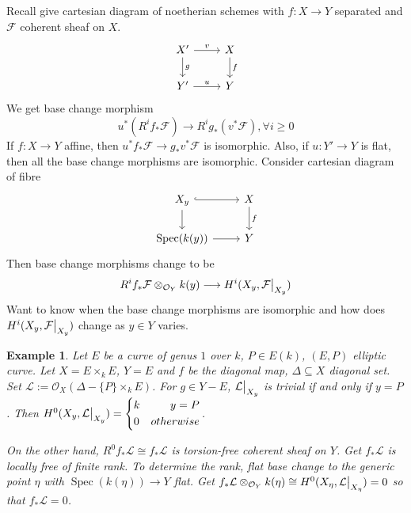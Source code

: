 \documentclass{ctexart}
\newtheorem{example}{Example}[section]
\newcommand{\spec}{\operatorname{Spec}}
\begin{document}
Recall give cartesian diagram of noetherian schemes with $f: X \longrightarrow Y$ separated and $\mathcal{F}$ coherent sheaf on $X$.
\begin{equation*}
    \begin{tikzcd}
        X' \arrow[r, "v"] \arrow[d, "g"] &
        X \arrow[d, "f"] \\
        Y' \arrow[r, "u"] &
        Y
    \end{tikzcd}
\end{equation*}
We get base change morphism 
\begin{equation*}
    u^{\ast}(R^{i}f_{\ast}\mathcal{F}) \longrightarrow R^{i}g_{\ast}(v^{\ast}\mathcal{F}), \forall i \ge 0
\end{equation*}
If $f: X \longrightarrow Y$ affine, then $u^{\ast}f_{\ast}\mathcal{F} \longrightarrow g_{\ast}v^{\ast}\mathcal{F}$ is isomorphic.
Also, if $u: Y' \longrightarrow Y$ is flat, then all the base change morphisms are isomorphic.
Consider cartesian diagram of fibre
\begin{equation*}
    \begin{tikzcd}
        X_{y} \arrow[r, hookrightarrow] \arrow[d] &
        X \arrow[d, "f"] \\
        \spec(k(y)) \arrow[r] &
        Y
    \end{tikzcd}
\end{equation*}
Then base change morphisms change to be 
\begin{equation*}
    R^{i}f_{\ast}\mathcal{F} \otimes_{\mathcal{O}_{Y}} k(y) \longrightarrow H^{i}(X_{y}, \mathcal{F}\big{|}_{X_{y}})
\end{equation*}
Want to know when the base change morphisms are isomorphic and how does $H^{i}(X_{y}, \mathcal{F}\big{|}_{X_{y}})$ change as $y\in Y$ varies.
\begin{example}
    Let $E$ be a curve of genus $1$ over $k$, $P\in E(k)$, $(E, P)$ elliptic curve.
    Let $X = E \times_{k} E$, $Y = E$ and $f$ be the diagonal map, $\Delta \subseteq X$ diagonal set.
    Set $\mathcal{L} := \mathcal{O}_{X}(\Delta -\{P\} \times_{k} E)$.
    For $g\in Y - E$, $\mathcal{L}\big{|}_{X_{y}}$ is trivial if and only if $y = P$.
    Then $H^{0}(X_{y}, \mathcal{L}\big{|}_{X_{y}}) =
    \left\{
        \begin{aligned}
            & k & y = P \\
            & 0 & otherwise
        \end{aligned}
    \right.$.
    \par
    On the other hand, $R^{0}f_{\ast}\mathcal{L} \cong f_{\ast}\mathcal{L}$ is torsion-free coherent sheaf on $Y$.
    Get $f_{\ast}\mathcal{L}$ is locally free of finite rank.
    To determine the rank, flat base change to the generic point $\eta$ with $\spec(k(\eta)) \longrightarrow Y$ flat.
    Get $f_{\ast}\mathcal{L} \otimes_{\mathcal{O}_{Y}} k(\eta) \cong H^{0}(X_{\eta}, \mathcal{L}\big{|}_{X_{\eta}}) = 0$ so that $f_{\ast}\mathcal{L} = 0$. 
\end{example}
\end{document}
